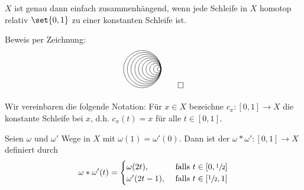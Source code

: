 \begin{lemma}[{name=[Charakterisierung von einfach zusammenhängend mittels Homotopie]},label=lem:einf-zsmh-homotopie]
	$X$ ist genau dann einfach zusammenhängend, wenn jede Schleife in $X$ homotop relativ $\set{0,1}$ zu einer konstanten Schleife ist.
\end{lemma}
\begin{beweis}
	Beweis per Zeichnung:
	\[
		\begin{tikzpicture}[scale=0.8]
			\foreach \r in {0.1, 0.2,...,1}{
				\draw (0,0) arc (0:360:\r); 
			}
		\end{tikzpicture}\qedhere
	\]
\end{beweis}

Wir vereinbaren die folgende Notation: 
Für $x \in X$ bezeichne $c_x \colon [0,1] \to X$ die konstante Schleife bei $x$, d.h. $c_x(t)= x $ für alle $ t \in [0,1]$.

\begin{definition}[{name=[Kompositionsweg]}]
	Seien $\omega$ und $\omega'$ Wege in $X$ mit $\omega(1)= \omega'(0)$. 
	Dann ist der  $\omega * \omega' \colon [0,1] \to X$ definiert durch 
	\[
		\omega * \omega' (t) = \begin{cases}
			\omega(2 t), &\text{ falls }t \in [0, \sfrac{1}{2}]\\
			\omega'(2t -1), &\text{ falls } t \in [\sfrac{1}{2},1]
		\end{cases}
	\]
\end{definition}

